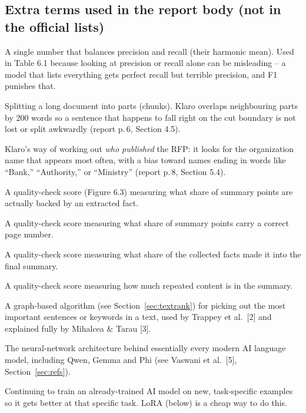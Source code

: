 \documentclass[11pt,a4paper]{article}
\begin{document}
\subsection{Extra terms used in the report body (not in the official lists)}
\begin{description}[style=nextline,leftmargin=2.2cm]
  \item[F1-score] A single number that balances precision and recall (their harmonic mean). Used in
    Table 6.1 because looking at precision or recall alone can be misleading -- a model that lists
    everything gets perfect recall but terrible precision, and F1 punishes that.
  \item[Chunking / chunk overlap] Splitting a long document into parts (chunks). Klaro overlaps
    neighbouring parts by 200 words so a sentence that happens to fall right on the cut boundary is
    not lost or split awkwardly (report p.\,6, Section 4.5).
  \item[Issuer detection] Klaro's way of working out \emph{who published} the RFP: it looks for the
    organization name that appears most often, with a bias toward names ending in words like
    ``Bank,'' ``Authority,'' or ``Ministry'' (report p.\,8, Section 5.4).
  \item[Grounding] A quality-check score (Figure 6.3) measuring what share of summary points are
    actually backed by an extracted fact.
  \item[Traceability] A quality-check score measuring what share of summary points carry a correct
    page number.
  \item[Coverage] A quality-check score measuring what share of the collected facts made it into the
    final summary.
  \item[Duplication] A quality-check score measuring how much repeated content is in the summary.
  \item[TextRank] A graph-based algorithm (see Section~\ref{sec:textrank}) for picking out the most
    important sentences or keywords in a text, used by Trappey et al.\ [2] and explained fully by
    Mihalcea \& Tarau [3].
  \item[Transformer / self-attention] The neural-network architecture behind essentially every
    modern AI language model, including Qwen, Gemma and Phi (see Vaswani et al.\ [5],
    Section~\ref{sec:refs}).
  \item[Fine-tuning] Continuing to train an already-trained AI model on new, task-specific examples
    so it gets better at that specific task. LoRA (below) is a cheap way to do this.
\end{description}
\end{document}
